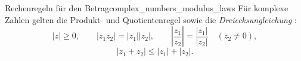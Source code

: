 \begin{KeyPointBox}{Rechenregeln für den Betrag}{complex_numbers_modulus_laws}
  Für komplexe Zahlen gelten die Produkt- und Quotientenregel sowie
  die \emph{Dreiecksungleichung} :
  \[
    |z|\ge0,\qquad |z_1z_2|=|z_1||z_2|,\qquad
    \left|\frac{z_1}{z_2}\right|=\frac{|z_1|}{|z_2|}\quad(z_2\ne0),
  \]
  \[
    |z_1+z_2|\le|z_1|+|z_2|.
  \]
\end{KeyPointBox}
